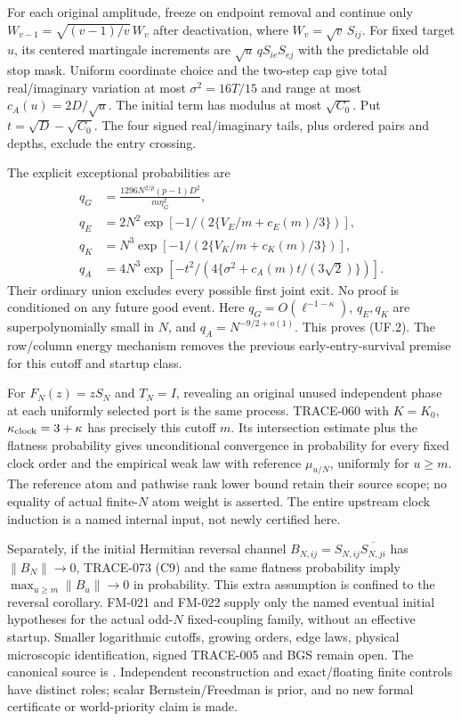 For each original amplitude, freeze on endpoint removal and continue only
$W_{v-1}=\sqrt{(v-1)/v}\,W_v$ after deactivation, where
$W_v=\sqrt v\,S_{ij}$. For fixed target $u$, its centered martingale
increments are $\sqrt u\,q S_{ie}S_{ej}$ with the predictable old stop mask.
Uniform coordinate choice and the two-step cap give total real/imaginary
variation at most $\sigma^2=16T/15$ and range at most
$c_A(u)=2D/\sqrt u$. The initial term has modulus at most $\sqrt{C_0}$.
Put $t=\sqrt D-\sqrt{C_0}$. The four signed real/imaginary tails, plus
ordered pairs and depths, exclude the entry crossing.

The explicit exceptional probabilities are
\[
 \begin{aligned}
 q_G&=\frac{1296N^{2/p}(p-1)D^2}{m\eta_G^2},\\
 q_E&=2N^2\exp[-1/(2\{V_E/m+c_E(m)/3\})],\\
 q_K&=N^3\exp[-1/(2\{V_K/m+c_K(m)/3\})],\\
 q_A&=4N^3\exp[-t^2/(4\{\sigma^2+c_A(m)t/(3\sqrt2)\})].
 \end{aligned}                                                   \tag{UF.7}
\]
Their ordinary union excludes every possible first joint exit. No proof
is conditioned on any future good event. Here $q_G=O(\ell^{-1-\kappa})$,
$q_E,q_K$ are superpolynomially small in $N$, and
$q_A=N^{-9/2+o(1)}$. This proves (UF.2). The row/column energy mechanism
removes the previous early-entry-survival premise for this cutoff and
startup class.

For $F_N(z)=zS_N$ and $T_N=I$, revealing an original unused independent
phase at each uniformly selected port is the same process. TRACE-060 with
$K=K_0$, $\kappa_{\rm clock}=3+\kappa$ has precisely this cutoff $m$.
Its intersection estimate plus the flatness probability gives unconditional
convergence in probability for every fixed clock order and the empirical
weak law with reference $\mu_{u/N}$, uniformly for $u\ge m$.
The reference atom and pathwise rank lower bound retain their source scope;
no equality of actual finite-$N$ atom weight is asserted. The entire upstream
clock induction is a named internal input, not newly certified here.

Separately, if the initial Hermitian reversal channel
$B_{N,ij}=S_{N,ij}\overline{S_{N,ji}}$ has $\|B_N\|\to0$,
TRACE-073 (C9) and the same flatness probability imply
$\max_{u\ge m}\|B_u\|\to0$ in probability. This extra assumption is confined
to the reversal corollary. FM-021 and FM-022 supply only the named eventual
initial hypotheses for the actual odd-$N$ fixed-coupling family, without
an effective startup. Smaller logarithmic cutoffs, growing orders, edge
laws, physical microscopic identification, signed TRACE-005 and BGS
remain open. The canonical source is
.
Independent reconstruction and exact/floating finite controls have distinct
roles; scalar Bernstein/Freedman is prior, and no new formal certificate
or world-priority claim is made.
